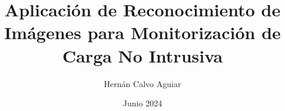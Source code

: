\newcommand{\Estudios}{Grado}

\newcommand{\TituloEstudios}{Ingeniería Informática}

\newcommand{\Departamento}{Departamento de Inteligencia Artificial (DIA)}

\newcommand{\NombreAutor}{Hernán Calvo Aguiar}

\newcommand{\NombreTutor}{Esteban Garcia Cuesta}

\newcommand{\TituloTFG}{Aplicación de Reconocimiento de Imágenes para Monitorización de Carga No Intrusiva}

\newcommand{\Fecha}{Junio 2024}

\title{\TituloTFG}
\author{\NombreAutor}
\date{\Fecha}
